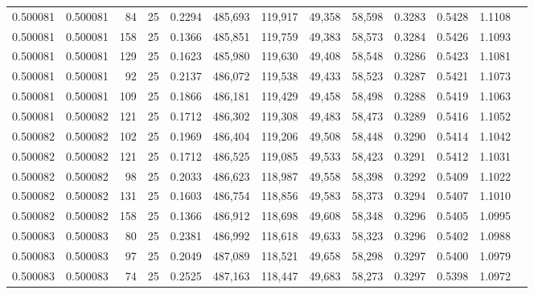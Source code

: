 \begin{tabular}{rrrrrrrrrrrrr}
0.500081 & 0.500081 &    84 &  25 &                                     0.2294 & 485,693 & 119,917 &  49,358 &  58,598 & 0.3283 & 0.5428 & 1.1108 \\
0.500081 & 0.500081 &   158 &  25 &                                     0.1366 & 485,851 & 119,759 &  49,383 &  58,573 & 0.3284 & 0.5426 & 1.1093 \\
0.500081 & 0.500081 &   129 &  25 &                                     0.1623 & 485,980 & 119,630 &  49,408 &  58,548 & 0.3286 & 0.5423 & 1.1081 \\
0.500081 & 0.500081 &    92 &  25 &                                     0.2137 & 486,072 & 119,538 &  49,433 &  58,523 & 0.3287 & 0.5421 & 1.1073 \\
0.500081 & 0.500081 &   109 &  25 &                                     0.1866 & 486,181 & 119,429 &  49,458 &  58,498 & 0.3288 & 0.5419 & 1.1063 \\
0.500081 & 0.500082 &   121 &  25 &                                     0.1712 & 486,302 & 119,308 &  49,483 &  58,473 & 0.3289 & 0.5416 & 1.1052 \\
0.500082 & 0.500082 &   102 &  25 &                                     0.1969 & 486,404 & 119,206 &  49,508 &  58,448 & 0.3290 & 0.5414 & 1.1042 \\
0.500082 & 0.500082 &   121 &  25 &                                     0.1712 & 486,525 & 119,085 &  49,533 &  58,423 & 0.3291 & 0.5412 & 1.1031 \\
0.500082 & 0.500082 &    98 &  25 &                                     0.2033 & 486,623 & 118,987 &  49,558 &  58,398 & 0.3292 & 0.5409 & 1.1022 \\
0.500082 & 0.500082 &   131 &  25 &                                     0.1603 & 486,754 & 118,856 &  49,583 &  58,373 & 0.3294 & 0.5407 & 1.1010 \\
0.500082 & 0.500082 &   158 &  25 &                                     0.1366 & 486,912 & 118,698 &  49,608 &  58,348 & 0.3296 & 0.5405 & 1.0995 \\
0.500083 & 0.500083 &    80 &  25 &                                     0.2381 & 486,992 & 118,618 &  49,633 &  58,323 & 0.3296 & 0.5402 & 1.0988 \\
0.500083 & 0.500083 &    97 &  25 &                                     0.2049 & 487,089 & 118,521 &  49,658 &  58,298 & 0.3297 & 0.5400 & 1.0979 \\
0.500083 & 0.500083 &    74 &  25 &                                     0.2525 & 487,163 & 118,447 &  49,683 &  58,273 & 0.3297 & 0.5398 & 1.0972 \\

\end{tabular}
